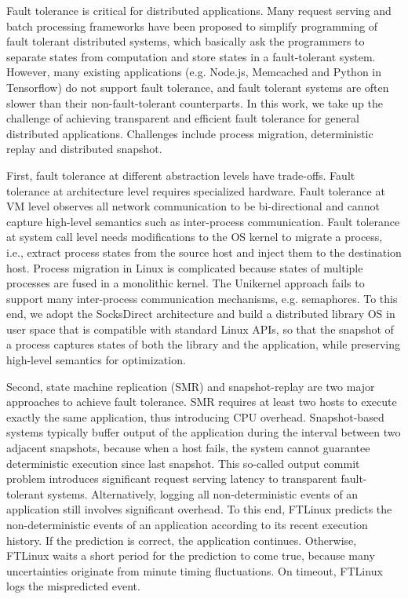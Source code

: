 Fault tolerance is critical for distributed applications. Many request serving and batch processing frameworks have been proposed to simplify programming of fault tolerant distributed systems, which basically ask the programmers to separate states from computation and store states in a fault-tolerant system. However, many existing applications (e.g. Node.js, Memcached and Python in Tensorflow) do not support fault tolerance, and fault tolerant systems are often slower than their non-fault-tolerant counterparts. In this work, we take up the challenge of achieving transparent and efficient fault tolerance for general distributed applications. Challenges include process migration, deterministic replay and distributed snapshot.

First, fault tolerance at different abstraction levels have trade-offs. Fault tolerance at architecture level requires specialized hardware. Fault tolerance at VM level observes all network communication to be bi-directional and cannot capture high-level semantics such as inter-process communication. Fault tolerance at system call level needs modifications to the OS kernel to migrate a process, i.e., extract process states from the source host and inject them to the destination host. Process migration in Linux is complicated because states of multiple processes are fused in a monolithic kernel. The Unikernel approach fails to support many inter-process communication mechanisms, e.g. semaphores. To this end, we adopt the SocksDirect architecture and build a distributed library OS in user space that is compatible with standard Linux APIs, so that the snapshot of a process captures states of both the library and the application, while preserving high-level semantics for optimization.

Second, state machine replication (SMR) and snapshot-replay are two major approaches to achieve fault tolerance. SMR requires at least two hosts to execute exactly the same application, thus introducing CPU overhead. Snapshot-based systems typically buffer output of the application during the interval between two adjacent snapshots, because when a host fails, the system cannot guarantee deterministic execution since last snapshot. This so-called output commit problem introduces significant request serving latency to transparent fault-tolerant systems. Alternatively, logging all non-deterministic events of an application still involves significant overhead. To this end, FTLinux predicts the non-deterministic events of an application according to its recent execution history. If the prediction is correct, the application continues. Otherwise, FTLinux waits a short period for the prediction to come true, because many uncertainties originate from minute timing fluctuations. On timeout, FTLinux logs the mispredicted event.

